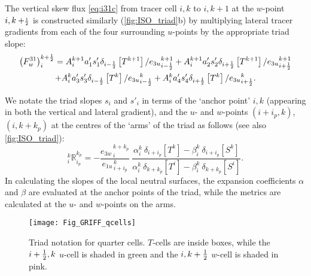 \documentclass[../tex_main/NEMO_manual]{subfiles}
\begin{document}
The vertical skew flux \autoref{eq:i31c} from tracer cell $i,k$ to $i,k+1$ at
the $w$-point $i,k+\scriptstyle\frac{1}{2}$ is constructed similarly (\autoref{fig:ISO_triad}b) by
multiplying lateral tracer gradients from each of the four surrounding $u$-points by the appropriate triad slope:
\begin{multline}
  \label{eq:i31}
  \left( F_w^{31} \right) _i ^{k+\frac{1}{2}} =  {A}_i^{k+1} a_{1}'
  s_{1}' \delta_{i-\frac{1}{2}} \left[ T^{k+1} \right]/{e_{3u}}_{i-\frac{1}{2}}^{k+1}
   +{A}_i^{k+1} a_{2}' s_{2}' \delta_{i+\frac{1}{2}} \left[ T^{k+1} \right]/{e_{3u}}_{i+\frac{1}{2}}^{k+1}\\
  + {A}_i^k a_{3}' s_{3}' \delta_{i-\frac{1}{2}} \left[ T^k\right]/{e_{3u}}_{i-\frac{1}{2}}^k
  +{A}_i^k a_{4}' s_{4}' \delta_{i+\frac{1}{2}} \left[ T^k \right]/{e_{3u}}_{i+\frac{1}{2}}^k.
\end{multline}

We notate the triad slopes $s_i$ and $s'_i$ in terms of the `anchor point' $i,k$
(appearing in both the vertical and lateral gradient),
and the $u$- and $w$-points $(i+i_p,k)$, $(i,k+k_p)$ at the centres of the `arms' of the triad as follows
(see also \autoref{fig:ISO_triad}):
\begin{equation}
  \label{eq:R}
  _i^k \mathbb{R}_{i_p}^{k_p}
  =-\frac{ {e_{3w}}_{\,i}^{\,k+k_p}} { {e_{1u}}_{\,i+i_p}^{\,k}}
  \
  \frac
  { \alpha_i^k  \ \delta_{i+i_p}[T^k] - \beta_i^k \ \delta_{i+i_p}[S^k] }
  { \alpha_i^k  \ \delta_{k+k_p}[T^i] - \beta_i^k \ \delta_{k+k_p}[S^i] }.
\end{equation}
In calculating the slopes of the local neutral surfaces,
the expansion coefficients $\alpha$ and $\beta$ are evaluated at the anchor points of the triad,
while the metrics are calculated at the $u$- and $w$-points on the arms.

\begin{figure}[tb] \begin{center}
    \texttt{[image: Fig\_GRIFF\_qcells]}
    \caption{   \protect\label{fig:qcells}
      Triad notation for quarter cells. $T$-cells are inside boxes,
      while the  $i+\textstyle\frac{1}{2},k$ $u$-cell is shaded in green and
      the $i,k+\textstyle\frac{1}{2}$ $w$-cell is shaded in pink.}
  \end{center} \end{figure}
\end{document}

